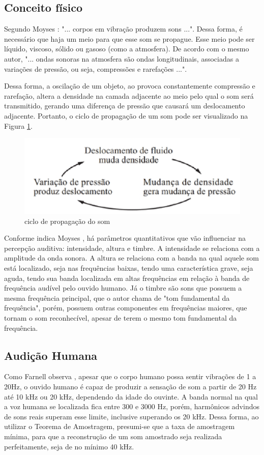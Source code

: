 \subsection{Conceito físico}
Segundo Moyses \cite{moyses}: "... corpos em vibração produzem sons ...". Dessa forma, é necessário que haja um meio para que esse som se propague. Esse meio pode ser líquido, viscoso, sólido ou gasoso (como a atmosfera). De acordo com o mesmo autor, "... ondas sonoras na atmosfera são ondas longitudinais, associadas a variações de pressão, ou seja, compressões e rarefações ...". \par Dessa forma, a oscilação de um objeto, ao provoca constantemente compressão e rarefação, altera a densidade na camada adjacente ao meio pelo qual o som será transmitido, gerando uma diferença de pressão que causará um deslocamento adjacente. Portanto, o ciclo de propagação de um som pode ser visualizado na Figura \ref{fig07}.

\begin{figure}[h]
	\centering
    \includegraphics[scale=0.7]{figuras/fig07.eps}
	\caption{ciclo de propagação do som}
	\label{fig07}
\end{figure}

Conforme indica Moyses \cite{moyses}, há parâmetros quantitativos que vão influenciar na percepção auditiva: intensidade, altura e timbre. A intensidade se relaciona com a amplitude da onda sonora. A altura se relaciona com a banda na qual aquele som está localizado, seja nas frequências baixas, tendo uma característica grave, seja aguda, tendo sua banda localizada em altas frequências em relação à banda de frequência audível pelo ouvido humano. Já o timbre são sons que possuem a mesma frequência principal, que o autor chama de "tom fundamental da frequência", porém, possuem outras componentes em frequências maiores, que tornam o som reconhecível, apesar de terem o mesmo tom fundamental da frequência.

\subsection{Audição Humana}
Como Farnell observa \cite{farnell}, apesar que o corpo humano possa sentir vibrações de 1 a 20Hz, o ouvido humano é capaz de produzir a sensação de som a partir de 20 Hz até 10 kHz ou 20 kHz, dependendo da idade do ouvinte. A banda normal na qual a voz humana se localizada fica entre 300 e 3000 Hz, porém, harmônicos advindos de sons reais superam esse limite, inclusive superando os 20 kHz.
Dessa forma, ao utilizar o Teorema de Amostragem, presumi-se que a taxa de amostragem mínima, para que a reconstrução de um som amostrado seja realizada perfeitamente, seja de no mínimo 40 kHz. 

